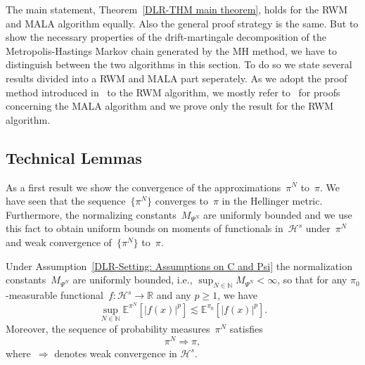The main statement, Theorem~\ref{DLR-THM main theorem}, holds for the RWM and MALA algorithm equally. Also the general proof strategy is the same. But to show the necessary properties of the drift-martingale decomposition of the Metropolis-Hastings Markov chain generated by the MH method, we have to distinguish between the two algorithms in this section. To do so we state several results divided into a RWM and MALA part seperately. As we adopt the proof method introduced in~\autocite{Pillai2012} to the RWM algorithm, we mostly refer to~\autocite{Pillai2012} for proofs concerning the MALA algorithm and we prove only the result for the RWM algorithm.



\subsection{Technical Lemmas} 
\label{sec:sub: DLR - Tehnical Lemmas}

As a first result we show the convergence of the approximations~$\pi^N$ to~$\pi$. We have seen that the sequence~$\{ \pi^N \}$ converges to~$\pi$ in the Hellinger metric. Furthermore, the normalizing constants~$M_{\Psi^N}$ are uniformly bounded and we use this fact to obtain uniform bounds on moments of functionals in~$\mathcal{H}^s$ under~$\pi^N$ and weak convergence of~$\{ \pi^N \}$ to~$\pi$.

\begin{lemma}\autocite[Lemma 3.5, Lemma 4.3]{Mattingly2010, Pillai2012}
  \label{DLR-Proof: Lemma Convergence of pi^N to pi}
  Under Assumption~\ref{DLR-Setting: Assumptions on C and Psi} the normalization constants~$M_{\Psi^N}$ are uniformly bounded, i.e., $ \sup_{N \in \mathbb{N}} M_{\Psi^N} < \infty$, so that for any $\pi_0$-measurable functional~$f: \mathcal{H}^s \to \mathbb{R}$ and any $p\geq 1$, we have
  \begin{equation*}
    \sup_{N \in \mathbb{N}} \mathbb{E}^{\pi^N} [| f(x) |^p] \lesssim \mathbb{E}^{\pi_0}[|f(x)|^p].
  \end{equation*}
  Moreover, the sequence of probability measures~$\pi^N$ satisfies
  \begin{equation*}
   \pi^N \Longrightarrow \pi,
  \end{equation*}
  where~$\Longrightarrow$ denotes weak convergence in $\mathcal{H}^s$.
 
\end{lemma}

